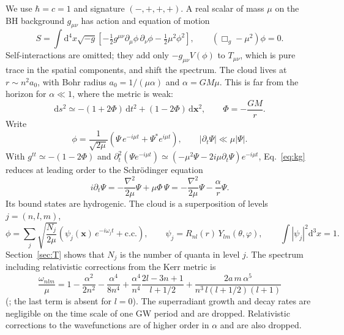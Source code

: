\documentclass[11pt]{article}
\newcommand{\dd}{\mathrm{d}}
\newcommand{\code}[1]{\path{#1}}
\newcommand{\bx}{\mathbf x}
\begin{document}
We use $\hbar=c=1$ and signature $(-,+,+,+)$. A real scalar of mass $\mu$ on the BH background $g_{\mu\nu}$ has action and equation of motion
\begin{equation}
S=\int\dd^4x\sqrt{-g}\left[-\tfrac12 g^{\mu\nu}\partial_\mu\phi\,\partial_\nu\phi-\tfrac12\mu^2\phi^2\right],\qquad
\left(\Box_g-\mu^2\right)\phi=0 .
\label{eq:kg}
\end{equation}
Self-interactions are omitted; they add only $-g_{\mu\nu}V(\phi)$ to $T_{\mu\nu}$, which is pure trace in the spatial components, and shift the spectrum. The cloud lives at $r\sim n^2a_0$, with Bohr radius $a_0=1/(\mu\alpha)$ and $\alpha=GM\mu$. This is far from the horizon for $\alpha\ll1$, where the metric is weak:
\begin{equation}
\dd s^2\simeq-(1+2\Phi)\,\dd t^2+(1-2\Phi)\,\dd\bx^2,\qquad \Phi=-\frac{GM}{r}.
\end{equation}
Write
\begin{equation}
\phi=\frac{1}{\sqrt{2\mu}}\left(\Psi\,e^{-i\mu t}+\Psi^*e^{i\mu t}\right),\qquad |\partial_t\Psi|\ll\mu|\Psi| .
\label{eq:nr_ansatz}
\end{equation}
With $g^{tt}\simeq-(1-2\Phi)$ and $\partial_t^2(\Psi e^{-i\mu t})\simeq(-\mu^2\Psi-2i\mu\partial_t\Psi)e^{-i\mu t}$, Eq.~\eqref{eq:kg} reduces at leading order to the Schr\"odinger equation
\begin{equation}
i\partial_t\Psi=-\frac{\nabla^2}{2\mu}\Psi+\mu\Phi\,\Psi=-\frac{\nabla^2}{2\mu}\Psi-\frac{\alpha}{r}\Psi .
\label{eq:schr}
\end{equation}
Its bound states are hydrogenic. The cloud is a superposition of levels $j=(n,l,m)$,
\begin{equation}
\phi=\sum_j\sqrt{\frac{N_j}{2\mu}}\left(\psi_j(\bx)\,e^{-i\omega_jt}+\mathrm{c.c.}\right),\qquad
\psi_j=R_{nl}(r)\,Y_{lm}(\theta,\varphi),\qquad \int|\psi_j|^2\dd^3x=1 .
\label{eq:modes}
\end{equation}
Section~\ref{sec:T} shows that $N_j$ is the number of quanta in level $j$. The spectrum including relativistic corrections from the Kerr metric is~\cite{BCP19}
\begin{equation}
\frac{\omega_{nlm}}{\mu}=1-\frac{\alpha^2}{2n^2}-\frac{\alpha^4}{8n^4}+\frac{\alpha^4}{n^4}\frac{2l-3n+1}{l+1/2}+\frac{2a\,m\,\alpha^5}{n^3\,l(l+1/2)(l+1)}
\label{eq:spectrum}
\end{equation}
(\code{gw_omega}; the last term is absent for $l=0$). The superradiant growth and decay rates are negligible on the time scale of one GW period and are dropped. Relativistic corrections to the wavefunctions are of higher order in $\alpha$ and are also dropped.
\end{document}

